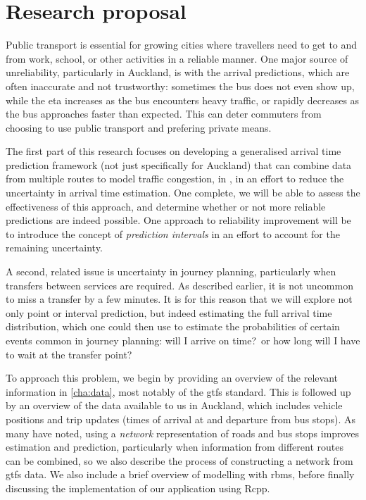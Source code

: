 \section{Research proposal}
\label{eq:proposal}

Public transport is essential for growing cities where travellers need to get to and from work, school, or other activities in a reliable manner. One major source of unreliability, particularly in Auckland, is with the \rt{} arrival predictions, which are often inaccurate and not trustworthy: sometimes the bus does not even show up, while  the \gls{eta} increases as the bus encounters heavy traffic, or rapidly decreases as the bus approaches faster than expected. This can deter commuters from choosing to use public transport and prefering private means.


The first part of this research focuses on developing a generalised arrival time prediction framework (not just specifically for Auckland) that can combine data from multiple routes to model traffic congestion, in \rt{}, in an effort to reduce the uncertainty in arrival time estimation. One complete, we will be able to assess the effectiveness of this approach, and determine whether or not more reliable predictions are indeed possible. One approach to reliability improvement will be to introduce the concept of \emph{prediction intervals} in an effort to account for the remaining uncertainty.


A second, related issue is uncertainty in journey planning, particularly when transfers between services are required. As described earlier, it is not uncommon to miss a transfer by a few minutes. It is for this reason that we will explore not only point or interval prediction, but indeed estimating the full arrival time distribution, which one could then use to estimate the probabilities of certain events common in journey planning: will I arrive on time?\ or how long will I have to wait at the transfer point?



To approach this problem, we begin by providing an overview of the relevant information in \cref{cha:data}, most notably of the \gls{gtfs} standard. This is followed up by an overview of the data available to us in Auckland, which includes vehicle positions and trip updates (times of arrival at and departure from bus stops). As many have noted, using a \emph{network} representation of roads and bus stops improves estimation and prediction, particularly when information from different routes can be combined, so we also describe the process of constructing a network from \gls{gtfs} data. We also include a brief overview of \rt{} modelling with \glspl{rbm}, before finally discussing the \rt{} implementation of our application using \textsf{Rcpp}.


